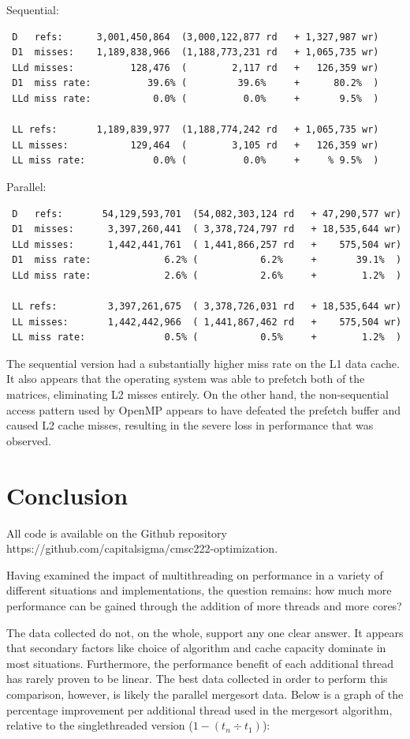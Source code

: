 \documentclass{article}
\begin{document}
Sequential:
\begin{verbatim}
 D   refs:      3,001,450,864  (3,000,122,877 rd   + 1,327,987 wr)
 D1  misses:    1,189,838,966  (1,188,773,231 rd   + 1,065,735 wr)
 LLd misses:          128,476  (        2,117 rd   +   126,359 wr)
 D1  miss rate:          39.6% (         39.6%     +      80.2%  )
 LLd miss rate:           0.0% (          0.0%     +       9.5%  )
 
 LL refs:       1,189,839,977  (1,188,774,242 rd   + 1,065,735 wr)
 LL misses:           129,464  (        3,105 rd   +   126,359 wr)
 LL miss rate:            0.0% (          0.0%     +     % 9.5%  )
\end{verbatim}

Parallel:
\begin{verbatim}
 D   refs:       54,129,593,701  (54,082,303,124 rd   + 47,290,577 wr)
 D1  misses:      3,397,260,441  ( 3,378,724,797 rd   + 18,535,644 wr)
 LLd misses:      1,442,441,761  ( 1,441,866,257 rd   +    575,504 wr)
 D1  miss rate:             6.2% (           6.2%     +       39.1%  )
 LLd miss rate:             2.6% (           2.6%     +        1.2%  )
 
 LL refs:         3,397,261,675  ( 3,378,726,031 rd   + 18,535,644 wr)
 LL misses:       1,442,442,966  ( 1,441,867,462 rd   +    575,504 wr)
 LL miss rate:              0.5% (           0.5%     +        1.2%  )
\end{verbatim}

The sequential version had a substantially higher miss rate on the L1
data cache. It also appears that the operating system was able to
prefetch both of the matrices, eliminating L2 misses entirely. On the
other hand, the non-sequential access pattern used by OpenMP appears
to have defeated the prefetch buffer and caused L2 cache misses,
resulting in the severe loss in performance that was observed.

\section{Conclusion}
All code is available on the Github repository
https://github.com/capitalsigma/cmsc222-optimization.

Having examined the impact of multithreading on performance in a
variety of different situations and implementations, the question
remains: how much more performance can be gained through the addition
of more threads and more cores?

The data collected do not, on the whole, support any one clear
answer. It appears that secondary factors like choice of algorithm and
cache capacity dominate in most situations. Furthermore, the
performance benefit of each additional thread has rarely proven to be
linear. The best data collected in order to perform this comparison,
however, is likely the parallel mergesort data. Below is a graph of
the percentage improvement per additional thread used in the mergesort
algorithm, relative to the singlethreaded version ($1 -(t_n \div
t_1)$):
\end{document}
